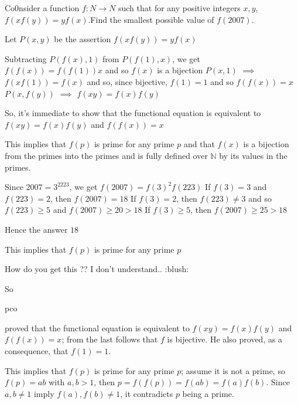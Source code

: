 \begin{solution}
	\begin{tcolorbox}Co0nsider a function $f:N\rightarrow N$ such that for any positive integers $x,y$,$f(xf(y))=yf(x)$.Find the smallest possible value of $f(2007)$.\end{tcolorbox}
Let $P(x,y)$ be the assertion $f(xf(y))=yf(x)$

Subtracting $P(f(x),1)$ from $P(f(1),x)$, we get $f(f(x))=f(f(1))x$ and so $f(x)$ is a bijection
$P(x,1)$ $\implies$ $f(xf(1))=f(x)$ and so, since bijective, $f(1)=1$ and so $f(f(x))=x$
$P(x,f(y))$ $\implies$ $f(xy)=f(x)f(y)$

So, it's immediate to show that the functional equation is equivalent to $f(xy)=f(x)f(y)$ and $f(f(x))=x$

This implies that $f(p)$ is prime for any prime $p$ and that $f(x)$ is a bijection from the primes into the primes and is fully defined over $\mathbb N$ by its values in the primes.

Since $2007=3^2223$, we get $f(2007)=f(3)^2f(223)$
If $f(3)=3$ and $f(223)=2$, then $f(2007)=18$
If $f(3)=2$, then $f(223)\ne 3$ and so $f(223)\ge 5$ and $f(2007)\ge 20>18$
If $f(3)\ge 5$, then $f(2007)\ge 25>18$

Hence the answer $\boxed{18}$
\end{solution}



\begin{solution}
	\begin{tcolorbox}This implies that $f(p)$ is prime for any prime $p$\end{tcolorbox}

How do you get this ?? I don't understand..  :blush:
\end{solution}



\begin{solution}
	So \begin{bolded}pco\end{bolded} proved that the functional equation is equivalent to $f(xy)=f(x)f(y)$ and $f(f(x))=x$; from the last follows that $f$ is bijective. He also proved, as a consequence, that $f(1)=1$.

This implies that $f(p)$ is prime for any prime $p$; assume it is not a prime, so $f(p) = ab$ with $a,b > 1$, then $p = f(f(p)) = f(ab) = f(a)f(b)$. Since $a,b \neq 1$ imply $f(a),f(b) \neq 1$, it contradicts $p$ being a prime.
\end{solution}



